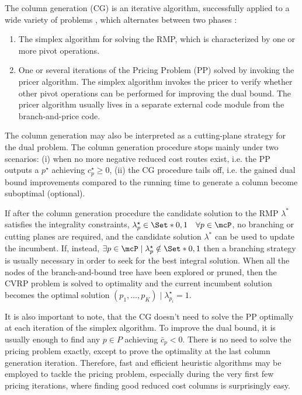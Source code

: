 \medskip

The column generation (CG) is an iterative algorithm,
successfully applied to a wide variety of problems \parencite{desrosiers2005},
which alternates between two phases \parencite{desaulniers2018}:
\begin{enumerate}
	\setlength{\itemsep}{0pt}
	\setlength{\parskip}{0pt}

	\item The simplex algorithm for solving the RMP, which is characterized by one or more pivot operations.
	\item One or several iterations of the Pricing Problem (PP) solved by invoking the pricer algorithm.
	      The simplex algorithm invokes the pricer to verify whether other pivot operations
	      can be performed for improving the dual bound.
	      The pricer algorithm usually lives in a separate external code module from the branch-and-price code.
\end{enumerate}

The column generation may also be interpreted as a cutting-plane strategy
for the dual problem.
The column generation procedure stops mainly under two scenarios:
(i) when no more negative reduced cost routes exist,
i.e. the PP outputs a $p^\star$ achieving $c^\star_p \ge 0$,
(ii) the CG procedure tails off,
i.e. the gained dual bound improvements
compared to the running time to generate a column
become suboptimal (optional).

If after the column generation procedure
the candidate solution to the RMP $\lambda^*$ satisfies the integrality constraints,
$\lambda^\star_p \in \Set*{0, 1} \quad \forall p \in \mcP$,
no branching or cutting planes are required,
and the candidate solution $\lambda^*$ can be used to update the incumbent.
If, instead,
$\exists p \in \mcP \mid \lambda^\star_p \notin \Set*{0, 1}$
then a branching strategy is usually necessary
in order to seek for the best integral solution.
When all the nodes of the branch-and-bound tree have been explored or pruned,
then the CVRP problem is solved to optimality
and the current incumbent solution becomes the optimal solution
$(p_1, \dots, p_K) \mid \lambda^\star_{p_i} = 1$.

\medskip

It is also important to note,
that the CG doesn't need to solve the PP optimally at each iteration of the simplex algorithm.
To improve the dual bound,
it is usually enough to find any $p \in P$ achieving $\bar{c}_p < 0$.
There is no need to solve the pricing problem exactly,
except to prove the optimality at the last column generation iteration.
Therefore, fast and efficient heuristic algorithms may be employed
to tackle the pricing problem,
especially during the very first few pricing iterations,
where finding good reduced cost columns is surprisingly easy.

